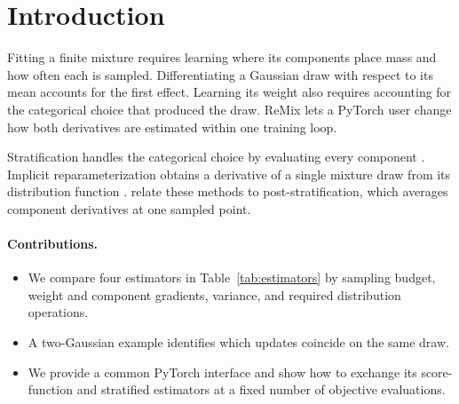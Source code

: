 \section{Introduction}
Fitting a finite mixture requires learning where its components place mass
and how often each is sampled. Differentiating a Gaussian draw with respect
to its mean accounts for the first effect. Learning its weight also requires
accounting for the categorical choice that produced the draw. ReMix lets a
PyTorch user change how both derivatives are estimated within one training loop.

Stratification handles the categorical choice by evaluating every component
\citep{morningstar2021mixtures}. Implicit reparameterization obtains a
derivative of a single mixture draw from its distribution function
\citep{figurnov2018implicit}. \citet{burroni2026mixture} relate these methods
to post-stratification, which averages component derivatives at one sampled
point.

\paragraph*{Contributions.}\leavevmode
\begin{itemize}
  \renewcommand{\labelitemi}{\textbullet}
  \item We compare four estimators in Table~\ref{tab:estimators} by sampling budget,
    weight and component gradients, variance, and required distribution operations.
  \item A two-Gaussian example identifies which updates coincide on the same draw.
  \item We provide a common PyTorch interface and show how to exchange its
    score-function and stratified estimators at a fixed number of objective evaluations.
\end{itemize}
